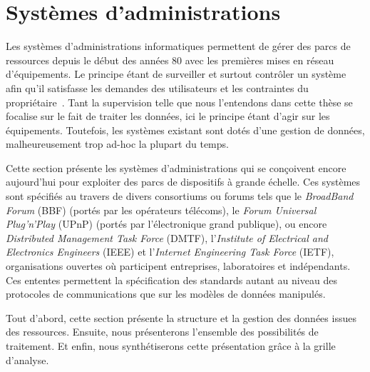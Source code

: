\section{Systèmes d'administrations}\label{sec:rw:supervision:administration}
Les systèmes d'administrations informatiques permettent de gérer des parcs de ressources depuis le début des années 80 avec les premières mises en réseau d'équipements. Le principe étant de surveiller et surtout contrôler un système afin qu'il satisfasse les demandes des utilisateurs et les contraintes du propriétaire~\cite{Sloman:management}. Tant la supervision telle que nous l'entendons dans cette thèse se focalise sur le fait de traiter les données, ici le principe étant d'agir sur les équipements. Toutefois, les systèmes existant sont dotés d'une gestion de données, malheureusement trop ad-hoc la plupart du temps.

Cette section présente les systèmes d'administrations qui se conçoivent encore aujourd'hui pour exploiter des parcs de dispositifs à grande échelle. Ces systèmes sont spécifiés au travers de divers consortiums ou forums tels que le \textit{BroadBand Forum} (BBF) (portés par les opérateurs télécoms), le \textit{Forum Universal Plug'n'Play} (UPnP) (portés par l'électronique grand publique), ou encore \textit{Distributed Management Task Force} (DMTF), l'\textit{Institute of Electrical and Electronics Engineers} (IEEE) et l'\textit{Internet Engineering Task Force} (IETF), organisations ouvertes où participent entreprises, laboratoires et indépendants. Ces ententes permettent la spécification des standards autant au niveau des protocoles de communications que sur les modèles de données manipulés.

Tout d'abord, cette section présente la structure et la gestion des données issues des ressources. Ensuite, nous présenterons l'ensemble des possibilités de traitement. Et enfin, nous synthétiserons cette présentation grâce à la grille d'analyse.
